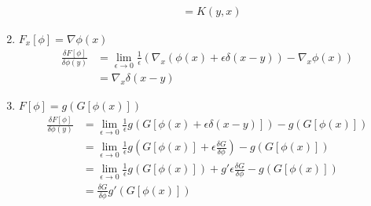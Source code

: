 \documentclass[10pt,a4paper]{book}
\theoremstyle{definition}
\begin{document}
\begin{enumerate}
\begin{align}
           &=K(y,x)
    \end{align}
    \item $F_x[\phi]=\nabla\phi(x)$
    \begin{align}
        \frac{\delta F[\phi]}{\delta\phi(y)}
        &=\lim_{\epsilon\rightarrow0}\frac{1}{\epsilon}\left( \nabla_x(\phi(x)+\epsilon\delta(x-y)) - \nabla_x\phi(x)\right)\\
        &=\nabla_x\delta(x-y)
    \end{align}
    \item $F[\phi]=g\left(G[\phi(x)]\right)$
    \begin{align}
        \frac{\delta F[\phi]}{\delta\phi(y)}
        &=\lim_{\epsilon\rightarrow0}\frac{1}{\epsilon}g(G[\phi(x)+\epsilon\delta(x-y)])-g(G[\phi(x)])\\
        &=\lim_{\epsilon\rightarrow0}\frac{1}{\epsilon}g(G[\phi(x)]+\epsilon\frac{\delta G}{\delta \phi})-g(G[\phi(x)])\\
        &=\lim_{\epsilon\rightarrow0}\frac{1}{\epsilon}g(G[\phi(x)])+g' \epsilon\frac{\delta G}{\delta \phi}-g(G[\phi(x)])\\
        &=\frac{\delta G}{\delta \phi}g'(G[\phi(x)])
    \end{align}
    
\end{enumerate}
\end{document}
